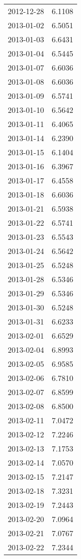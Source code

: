 \begin{tabular}{lr}
2012-12-28 &      6.1108 \\
2013-01-02 &      6.5051 \\
2013-01-03 &      6.6431 \\
2013-01-04 &      6.5445 \\
2013-01-07 &      6.6036 \\
2013-01-08 &      6.6036 \\
2013-01-09 &      6.5741 \\
2013-01-10 &      6.5642 \\
2013-01-11 &      6.4065 \\
2013-01-14 &      6.2390 \\
2013-01-15 &      6.1404 \\
2013-01-16 &      6.3967 \\
2013-01-17 &      6.4558 \\
2013-01-18 &      6.6036 \\
2013-01-21 &      6.5938 \\
2013-01-22 &      6.5741 \\
2013-01-23 &      6.5543 \\
2013-01-24 &      6.5642 \\
2013-01-25 &      6.5248 \\
2013-01-28 &      6.5346 \\
2013-01-29 &      6.5346 \\
2013-01-30 &      6.5248 \\
2013-01-31 &      6.6233 \\
2013-02-01 &      6.6529 \\
2013-02-04 &      6.8993 \\
2013-02-05 &      6.9585 \\
2013-02-06 &      6.7810 \\
2013-02-07 &      6.8599 \\
2013-02-08 &      6.8500 \\
2013-02-11 &      7.0472 \\
2013-02-12 &      7.2246 \\
2013-02-13 &      7.1753 \\
2013-02-14 &      7.0570 \\
2013-02-15 &      7.2147 \\
2013-02-18 &      7.3231 \\
2013-02-19 &      7.2443 \\
2013-02-20 &      7.0964 \\
2013-02-21 &      7.0767 \\
2013-02-22 &      7.2344 \\

\end{tabular}
